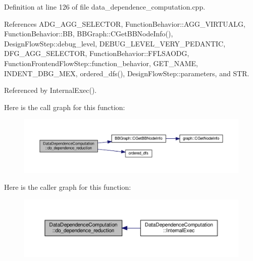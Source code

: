 Definition at line 126 of file data\+\_\+dependence\+\_\+computation.\+cpp.



References A\+D\+G\+\_\+\+A\+G\+G\+\_\+\+S\+E\+L\+E\+C\+T\+OR, Function\+Behavior\+::\+A\+G\+G\+\_\+\+V\+I\+R\+T\+U\+A\+LG, Function\+Behavior\+::\+BB, B\+B\+Graph\+::\+C\+Get\+B\+B\+Node\+Info(), Design\+Flow\+Step\+::debug\+\_\+level, D\+E\+B\+U\+G\+\_\+\+L\+E\+V\+E\+L\+\_\+\+V\+E\+R\+Y\+\_\+\+P\+E\+D\+A\+N\+T\+IC, D\+F\+G\+\_\+\+A\+G\+G\+\_\+\+S\+E\+L\+E\+C\+T\+OR, Function\+Behavior\+::\+F\+F\+L\+S\+A\+O\+DG, Function\+Frontend\+Flow\+Step\+::function\+\_\+behavior, G\+E\+T\+\_\+\+N\+A\+ME, I\+N\+D\+E\+N\+T\+\_\+\+D\+B\+G\+\_\+\+M\+EX, ordered\+\_\+dfs(), Design\+Flow\+Step\+::parameters, and S\+TR.



Referenced by Internal\+Exec().

Here is the call graph for this function\+:
\nopagebreak
\begin{figure}[H]
\begin{center}
\leavevmode
\includegraphics[width=350pt]{d3/dc0/classDataDependenceComputation_aa9f8b4902a09304d4c75850dfc0d0b10_cgraph}
\end{center}
\end{figure}
Here is the caller graph for this function\+:
\nopagebreak
\begin{figure}[H]
\begin{center}
\leavevmode
\includegraphics[width=350pt]{d3/dc0/classDataDependenceComputation_aa9f8b4902a09304d4c75850dfc0d0b10_icgraph}
\end{center}
\end{figure}
\mbox{\label{classDataDependenceComputation_afc0ac97b717aedd766f8deffc14cfee8}} 
